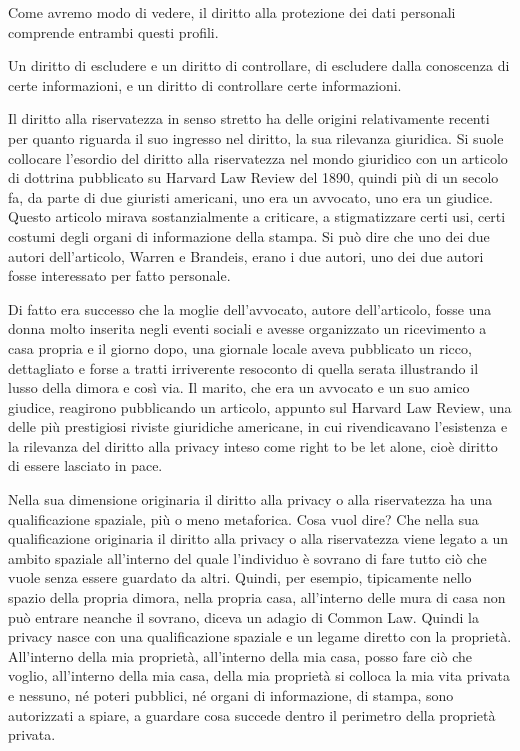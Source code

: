 Come avremo modo di vedere, il diritto alla protezione dei dati personali comprende entrambi questi profili. 

Un diritto di escludere e un diritto di controllare, di escludere dalla conoscenza di certe informazioni, e un diritto di controllare certe informazioni. 

Il diritto alla riservatezza in senso stretto ha delle origini relativamente recenti per quanto riguarda il suo ingresso nel diritto, la sua rilevanza giuridica. Si suole collocare l'esordio del diritto alla riservatezza nel mondo giuridico con un articolo di dottrina pubblicato su Harvard Law Review del 1890, quindi più di un secolo fa, da parte di due giuristi americani, uno era un avvocato, uno era un giudice. 
Questo articolo mirava sostanzialmente a criticare, a stigmatizzare certi usi, certi costumi degli organi di informazione della stampa. Si può dire che uno dei due autori dell'articolo, Warren e Brandeis, erano i due autori, uno dei due autori fosse interessato per fatto personale. 

Di fatto era successo che la moglie dell'avvocato, autore dell'articolo, fosse una donna molto inserita negli eventi sociali e avesse organizzato un ricevimento a casa propria e il giorno dopo, una giornale locale aveva pubblicato un ricco, dettagliato e forse a tratti irriverente resoconto di quella serata illustrando il lusso della dimora e così via. Il marito, che era un avvocato e un suo amico giudice, reagirono pubblicando un articolo, appunto sul Harvard Law Review, una delle più prestigiosi riviste giuridiche americane, in cui rivendicavano l'esistenza  e la rilevanza del diritto alla privacy inteso come right to be let alone, cioè diritto di essere lasciato in pace. 

Nella sua dimensione originaria il diritto alla privacy o alla riservatezza ha una qualificazione spaziale, più o meno metaforica. Cosa vuol dire? Che nella sua qualificazione originaria il diritto alla privacy o alla riservatezza viene legato a un ambito spaziale all'interno del quale l'individuo è sovrano di fare tutto ciò che vuole senza essere guardato da altri. 
Quindi, per esempio, tipicamente nello spazio della propria dimora, nella propria casa, all'interno delle mura di casa non può entrare neanche il sovrano, diceva un adagio di Common Law. Quindi la privacy nasce con una qualificazione spaziale e un legame diretto con la proprietà. All'interno della mia proprietà, all'interno della mia casa, posso fare ciò che voglio, all'interno della mia casa, della mia proprietà si colloca la mia vita privata e nessuno, né poteri pubblici, né organi di informazione, di stampa, sono autorizzati a spiare, a guardare cosa succede dentro il perimetro della proprietà privata. 

